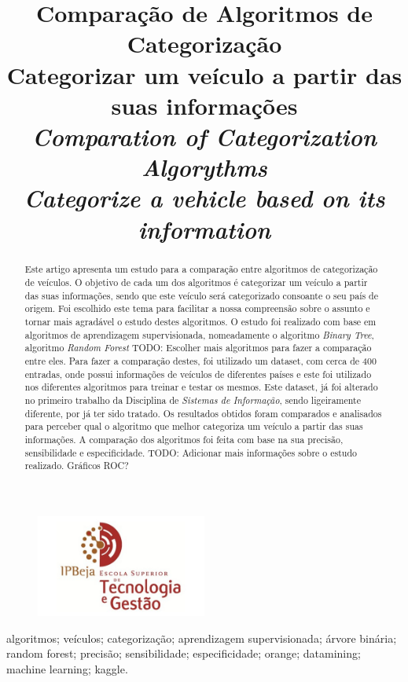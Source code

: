 \documentclass[conference]{IEEEtran}
\title{Comparação de Algoritmos de Categorização \\ \large Categorizar um veículo a partir das suas informações \\
\textit{Comparation of Categorization Algorythms \\ \large Categorize a vehicle based on its information}}
\author{
\IEEEauthorblockN{Martinho Caeiro - 23917 || Paulo Abade - 23919}
\IEEEauthorblockA{
    Instituto Politécnico de Beja\\
    Escola Superior de Tecnologia e Gestão\\
    Beja, Portugal\\
    23917@stu.ipbeja.pt || 23919@stu.ipbeja.pt
}
}
\begin{document}
\maketitle
\begin{figure}[!ht]
    \centering
    \includegraphics[width=0.5\textwidth]{Resources/Logo/IPBejaESTIG.jpg}
\end{figure}

\begin{abstract}
Este artigo apresenta um estudo para a comparação entre algoritmos de categorização de veículos. O objetivo de cada um dos 
algoritmos é categorizar um veículo a partir das suas informações, sendo que este veículo será categorizado consoante o seu 
país de origem. Foi escolhido este tema para facilitar a nossa compreensão sobre o assunto e tornar mais agradável o estudo
destes algoritmos. O estudo foi realizado com base em algoritmos de aprendizagem supervisionada, nomeadamente o algoritmo
\textit{Binary Tree}, algoritmo \textit{Random Forest} TODO: Escolher mais algoritmos para fazer a comparação entre eles. 
Para fazer a comparação destes, foi utilizado um dataset, com cerca de 400 entradas, onde possui informações de veículos de 
diferentes países e este foi utilizado nos diferentes algoritmos para treinar e testar os mesmos. Este dataset, já foi alterado 
no primeiro trabalho da Disciplina de \textit{Sistemas de Informação}, sendo ligeiramente diferente, por já ter sido tratado. 
Os resultados obtidos foram comparados e analisados para perceber qual o algoritmo que melhor categoriza um veículo a partir das 
suas informações. A comparação dos algoritmos foi feita com base na sua precisão, sensibilidade e especificidade. TODO: Adicionar 
mais informações sobre o estudo realizado. Gráficos ROC?
\end{abstract}

\begin{IEEEkeywords}
algoritmos; veículos; categorização; aprendizagem supervisionada; árvore binária; random forest; precisão; sensibilidade; especificidade;
orange; datamining; machine learning; kaggle.
\end{IEEEkeywords}
\end{document}
